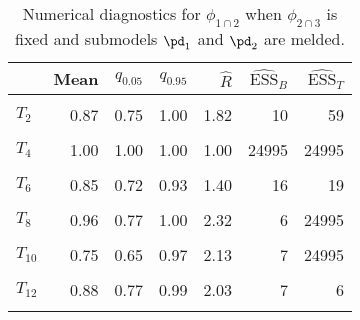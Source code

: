 \begin{table}

\caption{Numerical diagnostics for $\phi_{1 \cap 2}$ when $\phi_{2 \cap 3}$ is fixed and submodels $\pd_{1}$ and $\pd_{2}$ are melded.}
\centering
\begin{tabular}[t]{lrrrrrr}
\toprule
  & Mean & $q_{0.05}$ & $q_{0.95}$ & $\widehat{R}$ & $\widehat{\text{ESS}}_{B}$ & $\widehat{\text{ESS}}_{T}$\\
\midrule
\cellcolor{gray!6}{$T_{1}$} & \cellcolor{gray!6}{1.00} & \cellcolor{gray!6}{1.00} & \cellcolor{gray!6}{1.00} & \cellcolor{gray!6}{1.00} & \cellcolor{gray!6}{24995} & \cellcolor{gray!6}{24995}\\
$T_{2}$ & 0.87 & 0.75 & 1.00 & 1.82 & 10 & 59\\
\cellcolor{gray!6}{$T_{3}$} & \cellcolor{gray!6}{0.94} & \cellcolor{gray!6}{0.82} & \cellcolor{gray!6}{1.00} & \cellcolor{gray!6}{2.29} & \cellcolor{gray!6}{9} & \cellcolor{gray!6}{24995}\\
$T_{4}$ & 1.00 & 1.00 & 1.00 & 1.00 & 24995 & 24995\\
\cellcolor{gray!6}{$T_{5}$} & \cellcolor{gray!6}{1.00} & \cellcolor{gray!6}{1.00} & \cellcolor{gray!6}{1.00} & \cellcolor{gray!6}{1.00} & \cellcolor{gray!6}{24995} & \cellcolor{gray!6}{24995}\\
$T_{6}$ & 0.85 & 0.72 & 0.93 & 1.40 & 16 & 19\\
\cellcolor{gray!6}{$T_{7}$} & \cellcolor{gray!6}{0.94} & \cellcolor{gray!6}{0.76} & \cellcolor{gray!6}{1.00} & \cellcolor{gray!6}{1.44} & \cellcolor{gray!6}{10} & \cellcolor{gray!6}{24995}\\
$T_{8}$ & 0.96 & 0.77 & 1.00 & 2.32 & 6 & 24995\\
\cellcolor{gray!6}{$T_{9}$} & \cellcolor{gray!6}{0.75} & \cellcolor{gray!6}{0.53} & \cellcolor{gray!6}{1.00} & \cellcolor{gray!6}{2.11} & \cellcolor{gray!6}{8} & \cellcolor{gray!6}{24995}\\
$T_{10}$ & 0.75 & 0.65 & 0.97 & 2.13 & 7 & 24995\\
\cellcolor{gray!6}{$T_{11}$} & \cellcolor{gray!6}{0.95} & \cellcolor{gray!6}{0.82} & \cellcolor{gray!6}{1.00} & \cellcolor{gray!6}{1.75} & \cellcolor{gray!6}{8} & \cellcolor{gray!6}{24995}\\
$T_{12}$ & 0.88 & 0.77 & 0.99 & 2.03 & 7 & 6\\
\cellcolor{gray!6}{$T_{13}$} & \cellcolor{gray!6}{0.97} & \cellcolor{gray!6}{0.88} & \cellcolor{gray!6}{1.00} & \cellcolor{gray!6}{1.47} & \cellcolor{gray!6}{10} & \cellcolor{gray!6}{24995}\\

\end{tabular}
\end{table}
